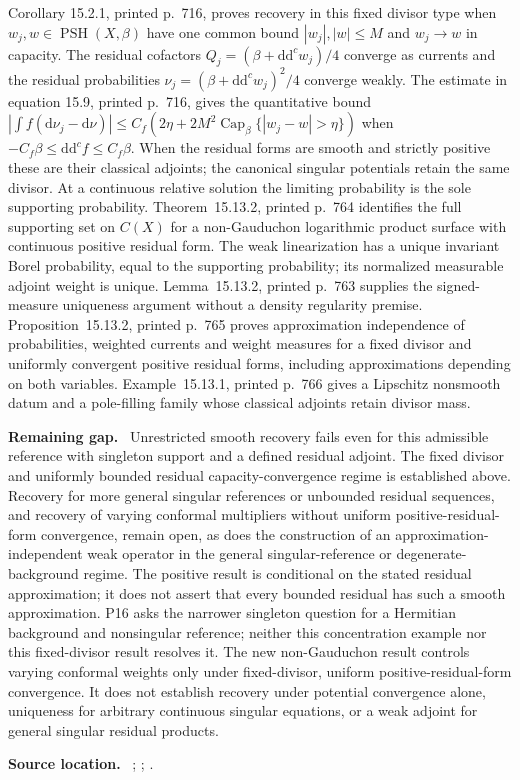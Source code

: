 \documentclass[11pt]{article}
\newcommand{\ddc}{\mathrm d\mathrm d^c}
\newcommand{\field}[1]{\par\medskip\noindent\textbf{#1.}\ }
\begin{document}
 Corollary 15.2.1, printed p.~716, proves recovery in this fixed divisor type when $w_j,w\in\operatorname{PSH}(X,\beta)$ have one common bound $|w_j|,|w|\leq M$ and $w_j\to w$ in capacity. The residual cofactors $Q_j=(\beta+\ddc w_j)/4$ converge as currents and the residual probabilities $\nu_j=(\beta+\ddc w_j)^2/4$ converge weakly. The estimate in equation 15.9, printed p.~716, gives the quantitative bound $|\int f(\mathrm d\nu_j-\mathrm d\nu)|\leq C_f(2\eta+2M^2\operatorname{Cap}_\beta\{|w_j-w|>\eta\})$ when $-C_f\beta\leq\ddc f\leq C_f\beta$. When the residual forms are smooth and strictly positive these are their classical adjoints; the canonical singular potentials retain the same divisor. At a continuous relative solution the limiting probability is the sole supporting probability. Theorem~15.13.2, printed p.~764 identifies the full supporting set on $C(X)$ for a non-Gauduchon logarithmic product surface with continuous positive residual form. The weak linearization has a unique invariant Borel probability, equal to the supporting probability; its normalized measurable adjoint weight is unique. Lemma~15.13.2, printed p.~763 supplies the signed-measure uniqueness argument without a density regularity premise. Proposition~15.13.2, printed p.~765 proves approximation independence of probabilities, weighted currents and weight measures for a fixed divisor and uniformly convergent positive residual forms, including approximations depending on both variables. Example~15.13.1, printed p.~766 gives a Lipschitz nonsmooth datum and a pole-filling family whose classical adjoints retain divisor mass.
\field{Remaining gap} Unrestricted smooth recovery fails even for this admissible reference with singleton support and a defined residual adjoint. The fixed divisor and uniformly bounded residual capacity-convergence regime is established above. Recovery for more general singular references or unbounded residual sequences, and recovery of varying conformal multipliers without uniform positive-residual-form convergence, remain open, as does the construction of an approximation-independent weak operator in the general singular-reference or degenerate-background regime. The positive result is conditional on the stated residual approximation; it does not assert that every bounded residual has such a smooth approximation. P16 asks the narrower singleton question for a Hermitian background and nonsingular reference; neither this concentration example nor this fixed-divisor result resolves it. The new non-Gauduchon result controls varying conformal weights only under fixed-divisor, uniform positive-residual-form convergence. It does not establish recovery under potential convergence alone, uniqueness for arbitrary continuous singular equations, or a weak adjoint for general singular residual products.
\field{Source location} ; ; .
\end{document}
